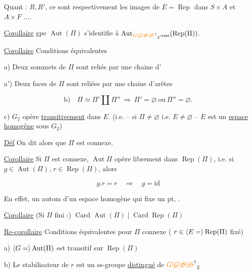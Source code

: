 

Quant : $R,R'$, ce sont respectivement les images de $E=\operatorname{Rep}$ dans $S\times A$ et $A\times F$ ....

\uline{Corollaire}  gpe $\operatorname{Aut}(\Pi)$ s'identifie à $\operatorname{Aut}_{\unsure{G|\mathcal G|\mathfrak G|\mathfrak S}_2\text{-ens}}(\operatorname{Rep}(\Pi))$.

\uline{Corollaire} Conditions équivalentes

a) Deux sommets de $\Pi$ sont  reliés par une chaine d'

a$'$) Deux faces de $\Pi$ sont  reliées par une chaine d'arêtes

\[
 \text{b)}\quad\Pi\simeq\Pi'\amalg\Pi''\ \Longrightarrow\ \Pi'=\varnothing\ \text{ou}\ \Pi''=\varnothing.
\]

c)  $G_2$ opère \uline{transitivement} dans $E$. (i.e. -- si $\Pi\ne\varnothing$ i.e. $E\ne\varnothing$ \deleted{\unsure{\}}} -- $E$ est un \uline{espace homogène} sous $G_2$)

 \uline{Déf} On dit alors que $\Pi$ est connexe.

\uline{Corollaire} Si $\Pi$ est connexe, $\operatorname{Aut}\Pi$ opère librement dans $\operatorname{Rep}(\Pi)$, i.e. si $g\in\operatorname{Aut}(\Pi)$, $r\in\operatorname{Rep}(\Pi)$, alors

\[
 g.r=r\quad\Longrightarrow\quad g=\mathrm{id}
\]

En effet, un autom d'un espace homogène qui fixe un pt,  .



\uline{Corollaire} (Si $\Pi$ fini :) $\operatorname{Card}\operatorname{Aut}(\Pi)\mid\operatorname{Card}\operatorname{Rep}(\Pi)$

\uline{Re-corollaire} Conditions équivalentes pour $\Pi$ connexe (  $r\in\inserted{E=}\operatorname{Rep}(\Pi)$ fixé)

a) $\inserted{G=}\operatorname{Aut}(\Pi)$ est transitif sur $\operatorname{Rep}(\Pi)$

b) Le stabilisateur de  $r$ est un ss-groupe \uline{distingué} de $\unsure{G|\mathcal G|\mathfrak G|\mathfrak S}_2$

